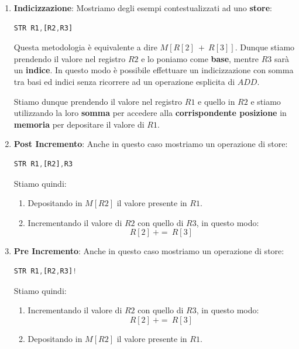 \documentclass{article}
\begin{document}
\begin{enumerate}
\begin{enumerate}
\vspace*{10px}

\item \textbf{Indicizzazione}: Mostriamo degli esempi contestualizzati ad uno \textbf{store}:
\begin{lstlisting}[language = JavaScript]
    STR R1,[R2,R3]
\end{lstlisting}
\vspace*{-20px}

Questa metodologia è equivalente a dire $M[R[2]\: + \:R[3]]$. Dunque stiamo prendendo il valore nel registro $R2$ e lo poniamo come \textbf{base}, mentre $R3$ sarà un \textbf{indice}. In questo modo è possibile effettuare un indicizzazione con somma tra basi ed indici senza ricorrere ad un operazione esplicita di $ADD$. 

Stiamo dunque prendendo il valore nel registro $R1$ e quello in $R2$ e stiamo utilizzando la loro \textbf{somma} per accedere alla \textbf{corrispondente posizione} in \textbf{memoria} per depositare il valore di $R1$. 

\vspace*{10px}

\item \textbf{Post Incremento}: Anche in questo caso mostriamo un operazione di store:
\begin{lstlisting}[language = JavaScript]
    STR R1,[R2],R3
\end{lstlisting}
\vspace*{-20px}

Stiamo quindi:
\begin{enumerate}
    \item Depositando in $M[R2]$ il valore presente in $R1$.
    \item Incrementando il valore di $R2$ con quello di $R3$, in questo modo:
    \[R[2]\: += \: R[3]\]

\end{enumerate}

\vspace*{10px}

\item \textbf{Pre Incremento}: Anche in questo caso mostriamo un operazione di store:
\begin{lstlisting}[language = JavaScript]
    STR R1,[R2,R3]!
\end{lstlisting}
\vspace*{-20px}

Stiamo quindi:
\begin{enumerate}
    \item Incrementando il valore di $R2$ con quello di $R3$, in questo modo:
    \[R[2]\: += \: R[3]\]
    \item Depositando in $M[R2]$ il valore presente in $R1$.
    

\end{enumerate}
\end{enumerate}
\end{enumerate}
\end{document}
